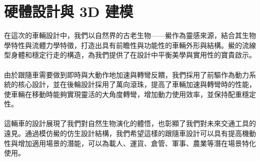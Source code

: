 \documentclass[a4paper,12pt]{article}
\begin{document}
\section{硬體設計與 3D 建模}
在這次的車輛設計中，我們以自然界的古老生物——鱟作為靈感來源，結合其生物學特性與流體力學特徵，打造出具有前瞻性與功能性的車輛外形與結構。鱟的流線型身體和穩定行走的構造，為我們提供了在設計中平衡美學與實用性的寶貴啟示。\\\\
由於跟隨車需要做到即時與大動作地加速與轉彎反饋，我們採用了前驅作為動力系統的核心設計，並在後輪設計採用了萬向滾珠，提高了車輛加速與轉彎時的性能，使車輛在移動時能夠實現靈活的大角度轉彎，增加動力使用效率，並保持配重穩定性。\\\\
這輛車的設計展現了我們對自然生物演化的體悟，也彰顯了我們對未來交通工具的遠見。通過模仿鱟的仿生設計結構，我們希望這樣的跟隨車設計可以具有提高機動性與增加適用場景的潛能，可以為載人、運貨、倉管、軍事、農業等潛在場景特化使用。
\end{document}
